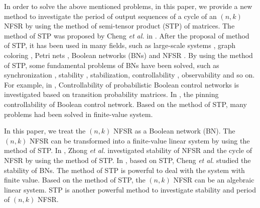 \documentclass[conference]{IEEEtran}
\begin{document}
In order to solve the above mentioned problems, in this paper, we provide a new method to investigate the period of output sequences of a cycle of an $(n,k)$ NFSR by using the method of semi-tensor product (STP) of matrices. The method of STP was proposed by Cheng \textit{et al.} in \cite{Cheng2012An}\cite{Cheng2010A}\cite{Cheng2011Analysis}. After the proposal of method of STP, it has been used in many fields, such as large-scale systems \cite{Zhao2013Aggregation}\cite{Zhao2016Control}, graph coloring \cite{Wang2012A}\cite{Zhong2015Finding}, Petri nets \cite{Han2015Calculation}, Boolean networks (BNs) \cite{Guo2015Set}\cite{Fornasini2013On} and NFSR \cite{Zhong2014Stability}\cite{Zhao2014Novel}. By using the method of STP, some fundamental problems of BNs have been solved,
such as synchronization \cite{Zhong2014Synchronization}\cite{Zhang2014Synchronization}, stability \cite{Liu2016Sampled}\cite{Li2014Stability}\cite{Fornasini2013On}, stabilization\cite{Li2016Feedback}\cite{Bof2015Output}, controllability \cite{Liu2014Some}\cite{Lu2016On}\cite{Zhong2016Controllability}\cite{Liu2015Controllability}\cite{Li2016On}, observability \cite{Laschov2013Observability}\cite{Zhang2013Controllability} and so on. For example, in \cite{Liu2015Controllability}, Controllability of probabilistic Boolean control networks is investigated based on transition probability matrices. In \cite{Lu2015On}, the pinning controllability of Boolean control network. Based on the method of STP, many problems had been solved in finite-value system.

In this paper, we treat the $(n,k)$ NFSR as a Boolean network (BN). The $(n,k)$ NFSR can be transformed into a finite-value linear system by using the method of STP. In \cite{Zhong2014Stability}, Zhong \textit{et al.} investigated stability of NFSR and the cycle of NFSR by using the method of STP. In \cite{Cheng2011Stability}, based on STP, Cheng \textit{et al.} studied the stability of BNs. The method of STP is powerful to deal with the system with finite value. Based on the method of STP, the $(n,k)$ NFSR can be an algebraic linear system. STP is another powerful method to investigate stability and period of $(n,k)$ NFSR.
\end{document}
